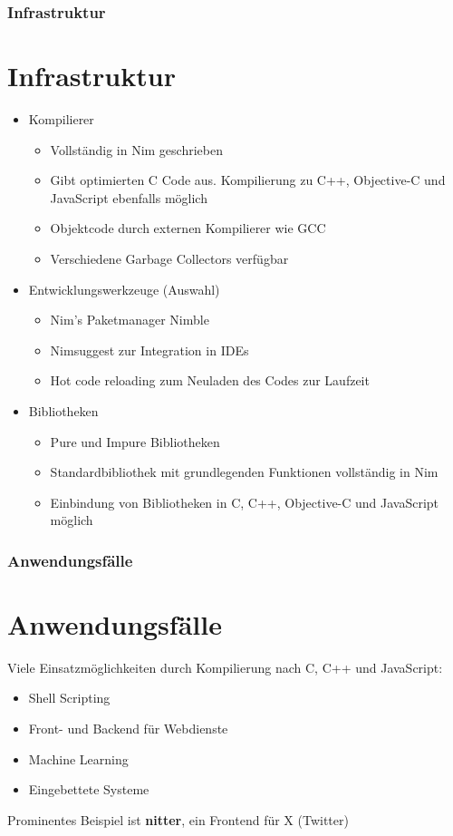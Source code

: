 \documentclass{beamer}
\begin{document}
\begin{frame}
\frametitle{Infrastruktur}
\section{Infrastruktur}
\begin{itemize}
	\item Kompilierer
	\begin{itemize}
		\item Vollständig in Nim geschrieben
		\item Gibt optimierten C Code aus. Kompilierung zu C++, Objective-C und JavaScript ebenfalls möglich
		\item Objektcode durch externen Kompilierer wie GCC
		\item Verschiedene Garbage Collectors verfügbar
	\end{itemize}
	\item Entwicklungswerkzeuge (Auswahl)
	\begin{itemize}
		\item Nim's Paketmanager Nimble
		\item Nimsuggest zur Integration in IDEs
		\item Hot code reloading zum Neuladen des Codes zur Laufzeit
	\end{itemize}
	\item Bibliotheken
	\begin{itemize}
		\item Pure und Impure Bibliotheken
		\item Standardbibliothek mit grundlegenden Funktionen vollständig in Nim
		\item Einbindung von Bibliotheken in C, C++, Objective-C und JavaScript möglich
	\end{itemize}
\end{itemize}
\end{frame}


\begin{frame}
\frametitle{Anwendungsfälle}
\section{Anwendungsfälle}
Viele Einsatzmöglichkeiten durch Kompilierung nach C, C++ und JavaScript:
\begin{itemize}
	\item Shell Scripting
	\item Front- und Backend für Webdienste
	\item Machine Learning
	\item Eingebettete Systeme
\end{itemize}

Prominentes Beispiel ist \textbf{nitter}, ein Frontend für X (Twitter)
\end{frame}
\end{document}
